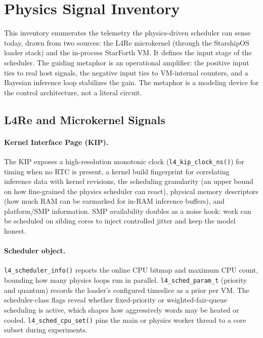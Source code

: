 
\section{Physics Signal Inventory}

This inventory enumerates the telemetry the physics-driven scheduler can sense
today, drawn from two sources: the L4Re microkernel (through the StarshipOS loader
stack) and the in-process StarForth VM. It defines the input stage of the
scheduler. The guiding metaphor is an operational amplifier: the positive input
ties to real host signals, the negative input ties to VM-internal counters, and a
Bayesian inference loop stabilizes the gain. The metaphor is a modeling device for
the control architecture, not a literal circuit.

\subsection{L4Re and Microkernel Signals}

\paragraph{Kernel Interface Page (KIP).} The KIP exposes a high-resolution monotonic
clock (\texttt{l4\_kip\_clock\_ns()}) for timing when no RTC is present, a kernel
build fingerprint for correlating inference data with kernel revisions, the
scheduling granularity (an upper bound on how fine-grained the physics scheduler can
react), physical memory descriptors (how much RAM can be earmarked for in-RAM
inference buffers), and platform/SMP information. SMP availability doubles as a noise
hook: work can be scheduled on sibling cores to inject controlled jitter and keep the
model honest.

\paragraph{Scheduler object.} \texttt{l4\_scheduler\_info()} reports the online CPU
bitmap and maximum CPU count, bounding how many physics loops run in parallel.
\texttt{l4\_sched\_param\_t} (priority and quantum) records the loader's configured
timeslice as a prior per VM. The scheduler-class flags reveal whether fixed-priority
or weighted-fair-queue scheduling is active, which shapes how aggressively words may
be heated or cooled. \texttt{l4\_sched\_cpu\_set()} pins the main or physics worker
thread to a core subset during experiments.

